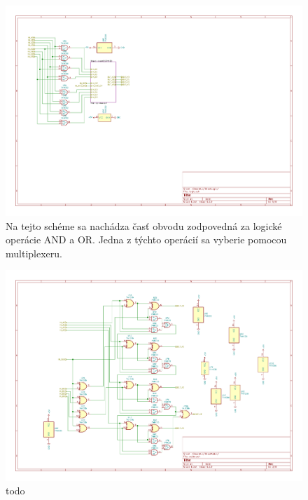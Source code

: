 \documentclass{article}
\begin{document}
    \begin{figure}[h!]
        \centering
        \includegraphics[width=.9\linewidth]{logic_sheet.pdf}
        \caption{Na tejto schéme sa nachádza časť obvodu zodpovedná za logické operácie AND a OR. Jedna z týchto operácií sa vyberie pomocou multiplexeru.}
    \end{figure}

    \begin{figure}[h!]
        \centering
        \includegraphics[width=.9\linewidth]{adder_sheet.pdf}
        \caption{todo}
    \end{figure}
\end{document}
